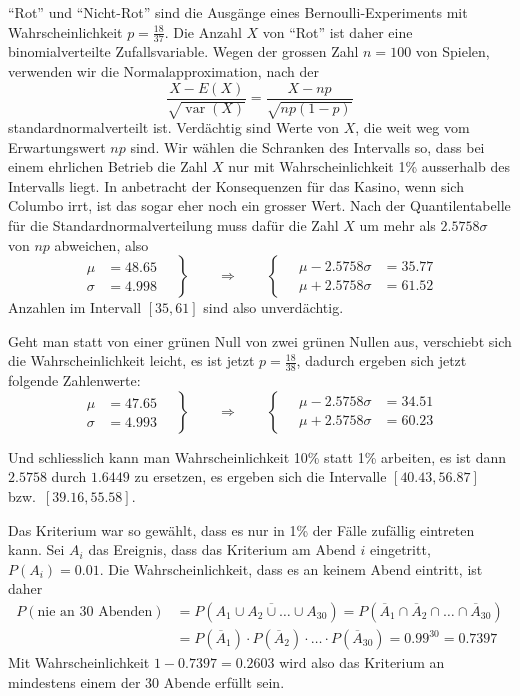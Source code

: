 \begin{loesung}
\begin{teilaufgaben}
\item
``Rot'' und ``Nicht-Rot'' sind die Ausgänge eines Bernoulli-Experiments mit
Wahrscheinlichkeit $p=\frac{18}{37}$. Die Anzahl $X$ von ``Rot'' ist daher
eine binomialverteilte Zufallsvariable. Wegen der grossen Zahl $n=100$
von Spielen, verwenden wir die Normalapproximation, nach der 
\[
\frac{X-E(X)}{\sqrt{\operatorname{var}(X)}}=\frac{X-np}{\sqrt{np(1-p)}}
\]
standardnormalverteilt ist. Verdächtig sind Werte von $X$, die weit
weg vom Erwartungswert $np$ sind. Wir wählen die Schranken des Intervalls
so, dass bei einem ehrlichen Betrieb die Zahl $X$ nur mit Wahrscheinlichkeit
1\% ausserhalb des Intervalls liegt. In anbetracht der Konsequenzen
für das Kasino, wenn sich Columbo irrt, ist das sogar eher noch ein
grosser Wert. Nach der Quantilentabelle für die
Standardnormalverteilung muss dafür die Zahl $X$ um mehr als $2.5758\sigma$
von $np$ abweichen, also
\[
\left.
\begin{aligned}
\mu&=48.65\\
\sigma&=4.998
\end{aligned}
\quad
\right\}
\qquad
\Rightarrow
\qquad
\left\{\quad
\begin{aligned}
\mu - 2.5758\sigma&=35.77\\
\mu + 2.5758\sigma&=61.52
\end{aligned}
\right.
\]
Anzahlen im Intervall $[35,61]$ sind also unverdächtig.

Geht man statt von einer grünen Null von zwei grünen Nullen aus, verschiebt
sich die Wahrscheinlichkeit leicht, es ist jetzt $p=\frac{18}{38}$, dadurch
ergeben sich jetzt folgende Zahlenwerte:
\[
\left.
\begin{aligned}
\mu&=47.65\\
\sigma&=4.993
\end{aligned}
\quad
\right\}
\qquad
\Rightarrow
\qquad
\left\{\quad
\begin{aligned}
\mu - 2.5758\sigma&=34.51\\
\mu + 2.5758\sigma&=60.23
\end{aligned}
\right.
\]

Und schliesslich kann man Wahrscheinlichkeit 10\% statt 1\% arbeiten, 
es ist dann $2.5758$ durch $1.6449$ zu ersetzen, es ergeben sich
die Intervalle $[40.43, 56.87]$ bzw.~$[39.16, 55.58]$.
\item
Das Kriterium war so gewählt, dass es nur in 1\% der Fälle zufällig
eintreten kann. Sei $A_i$ das Ereignis, dass das Kriterium am Abend $i$
eingetritt, $P(A_i)=0.01$.
Die Wahrscheinlichkeit, dass es an keinem Abend eintritt,
ist daher 
\begin{align*}
P(\text{nie an 30 Abenden})&=P(\overline{A_1\cup A_2\cup\dots\cup A_{30}})
=P(
\overline{A}_1
\cap
\overline{A}_2
\cap
\dots
\cap
\overline{A}_{30}
)
\\
&=
P(\overline{A}_1)
\cdot
P(\overline{A}_2)
\cdot
\dots
\cdot
P(\overline{A}_{30})
=0.99^{30}=0.7397
\end{align*}
Mit Wahrscheinlichkeit $1-0.7397=0.2603$ wird also das Kriterium an mindestens
einem der 30 Abende erfüllt sein.


\end{teilaufgaben}
\end{loesung}
